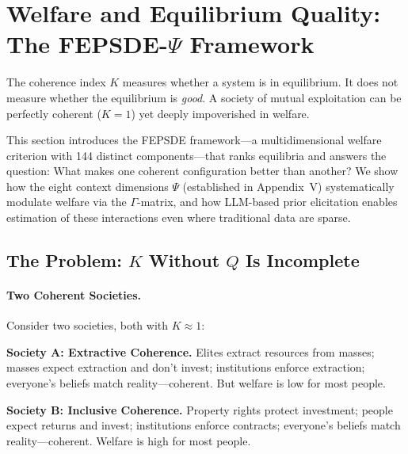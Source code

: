 \section{Welfare and Equilibrium Quality: The FEPSDE-$\Psi$ Framework}
\label{sec:fepsde}

The coherence index $K$ measures whether a system is in equilibrium.
It does not measure whether the equilibrium is \emph{good}.
A society of mutual exploitation can be perfectly coherent ($K = 1$)
yet deeply impoverished in welfare.

This section introduces the FEPSDE framework---a multidimensional welfare criterion
with 144 distinct components---that ranks equilibria and answers the question: 
What makes one coherent configuration better than another? We show how the eight 
context dimensions $\Psi$ (established in Appendix~V) systematically modulate welfare 
via the $\Gamma$-matrix, and how LLM-based prior elicitation enables estimation of 
these interactions even where traditional data are sparse.

\subsection{The Problem: $K$ Without $Q$ Is Incomplete}

\paragraph{Two Coherent Societies.}
Consider two societies, both with $K \approx 1$:

\textbf{Society A: Extractive Coherence.}
Elites extract resources from masses; masses expect extraction and don't invest;
institutions enforce extraction; everyone's beliefs match reality---coherent.
But welfare is low for most people.

\textbf{Society B: Inclusive Coherence.}
Property rights protect investment; people expect returns and invest;
institutions enforce contracts; everyone's beliefs match reality---coherent.
Welfare is high for most people.

